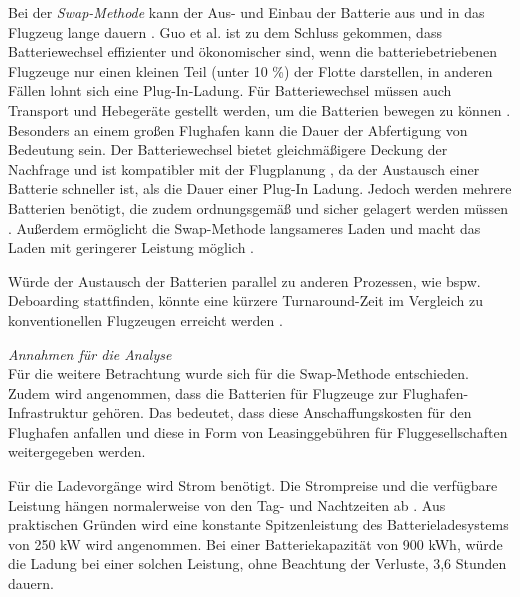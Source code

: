 Bei der \textit{Swap-Methode} kann der Aus- und Einbau der Batterie aus 
und in das Flugzeug lange dauern \cite{dalmia2022powering}. 
Guo et al. \cite{guo2020aviation} ist zu dem Schluss gekommen, 
dass Batteriewechsel effizienter und ökonomischer sind, 
wenn die batteriebetriebenen Flugzeuge nur einen kleinen Teil (unter 10 \%) der Flotte darstellen, 
in anderen Fällen lohnt sich eine Plug-In-Ladung. 
Für Batteriewechsel müssen auch Transport und Hebegeräte gestellt werden, 
um die Batterien bewegen zu können \cite{reimers2018introduction}.
Besonders an einem großen Flughafen kann die Dauer der Abfertigung von Bedeutung sein.
Der Batteriewechsel bietet gleichmäßigere Deckung der Nachfrage \cite{guo2020aviation} 
und ist kompatibler mit der Flugplanung \cite{salucci2020optimal}, 
da der Austausch einer Batterie schneller ist, als die Dauer einer Plug-In Ladung. 
Jedoch werden mehrere Batterien benötigt, 
die zudem ordnungsgemäß und sicher gelagert werden müssen \cite{salucci2020optimal}.
Außerdem ermöglicht die Swap-Methode langsameres Laden und macht 
das Laden mit geringerer Leistung möglich \cite{avogadro2024demystifying}.

Würde der Austausch der Batterien parallel zu anderen Prozessen, 
wie bspw. Deboarding stattfinden, könnte eine kürzere Turnaround-Zeit im 
Vergleich zu konventionellen Flugzeugen erreicht werden \cite{schmidt2016challenges}.

\textit{Annahmen für die Analyse}\\
%
Für die weitere Betrachtung wurde sich für die Swap-Methode entschieden. 
Zudem wird angenommen, dass die Batterien für Flugzeuge zur Flughafen-Infrastruktur gehören.
Das bedeutet, dass diese Anschaffungskosten für den Flughafen anfallen 
und diese in Form von Leasinggebühren für Fluggesellschaften weitergegeben werden.

Für die Ladevorgänge wird Strom benötigt. 
Die Strompreise und die verfügbare Leistung hängen normalerweise 
von den Tag- und Nachtzeiten ab \cite{salucci2020optimal}. 
Aus praktischen Gründen wird eine konstante Spitzenleistung des Batterieladesystems von 250 kW wird angenommen. 
Bei einer Batteriekapazität von 900 kWh, würde die Ladung bei einer solchen Leistung, 
ohne Beachtung der Verluste, 3,6 Stunden dauern.


